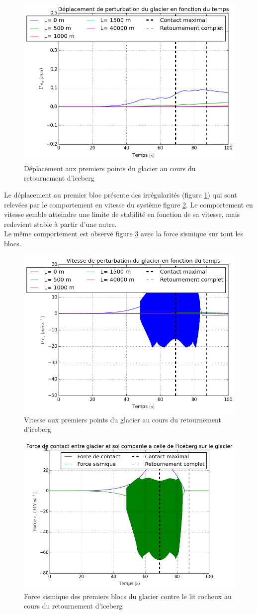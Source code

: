 \documentclass[11pt, a4paper]{article}
\begin{document}
\begin{figure}
	\centering
	\includegraphics[width=0.5\linewidth]{figures/Part3/Subpart1/Deplacement.png}
	\caption{Déplacement aux premiers points du glacier au cours du retournement d'iceberg}
	\label{UtInstablePart3}
\end{figure}
Le déplacement au premier bloc présente des irrégularités (figure \ref{UtInstablePart3}) qui sont relevées par le comportement en vitesse du système figure \ref{UtdInstablePart3}. Le comportement en vitesse semble atteindre une limite de stabilité en fonction de sa vitesse, mais redevient stable à partir d'une autre. 
\\

Le même comportement est observé figure \ref{FsisInstablePart3} avec la force sismique sur tout les blocs. 

\begin{figure}
	\centering
	\includegraphics[width=0.5\linewidth]{figures/Part3/Subpart1/Vitesse.png}
	\caption{Vitesse aux premiers points du glacier au cours du retournement d'iceberg}
	\label{UtdInstablePart3}
\end{figure}

\begin{figure}
	\centering
	\includegraphics[width=0.5\linewidth]{figures/Part3/Subpart1/Fsismique.png}
	\caption{Force sismique des premiers blocs du glacier contre le lit rocheux au cours du retournement d'iceberg}
	\label{FsisInstablePart3}
\end{figure}
\end{document}
